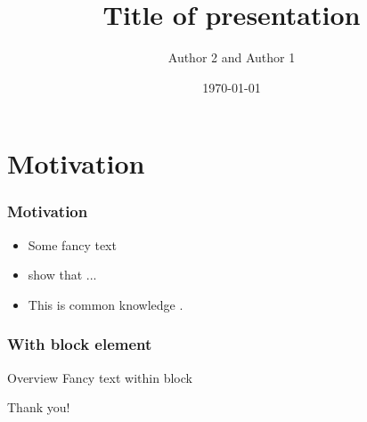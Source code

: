 
\title[short title]{Title of presentation}
\date{\today}
\author[Author 1 (Institution)]{Author 2 \inst{*} and Author 1\inst{$\dagger$}}

\makeatletter
\let\old@beamer@writeslidentry\beamer@writeslidentry
\def\beamer@writeslidentry{%
	\expandafter\beamer@ifempty\expandafter{\beamer@framestartpage}{}%
	{%
		\clearpage\beamer@notesactions%
	}
}
\makeatother


	\begin{frame}[plain]
		\maketitle
	\end{frame}
	
	
	\section{Motivation}
	\begin{frame}
		\frametitle{Motivation}
		\begin{itemize}
			\item Some fancy text
			\item \citet{Dustmann2014} show that ...
			\item This is common knowledge \citep[e.g.][]{Athey2017}.
		\end{itemize}
	\end{frame}


	\begin{frame}
		\frametitle{With block element}	
		\begin{block}{Overview}
			Fancy text within block
		\end{block}
	\end{frame}
	
	
	\begin{frame}
		\begin{center}
			\huge{Thank you!}
			\vspace{2cm}
		\end{center}
	\end{frame}

